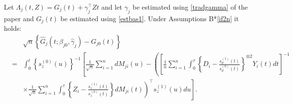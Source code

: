 \documentclass[11pt]{article}
\newcommand{\eqnn}{\begin{eqnarray*}}
\newcommand{\een}{\end{eqnarray*}}
\begin{document}
\begin{lemmas}\label{ifQ21ab}
Let $\Lambda_j(t,Z)=G_j(t) + \gamma_j^{\top} Z t$ and let  $ \gamma_j$ be estimated using \eqref{tradgamma} of the paper and $G_j(t)$ be estimated using \eqref{estbas1}.
Under Assumptions B*\ref{if2n} it holds:
\eqnn
&&\sqrt{n}\left\{\hat G_j(t ; \beta_{j0}, \hat \gamma_j)-G_{j0}(t)\right\}
\\&=&\int_0^t\left\{s_z^{(0)}(u)\right\}^{-1}\left[\frac{1}{\sqrt{n}}\sum_{i=1}^ndM_{ji}(u)-\left(\left[\frac{1}{n}\sum_{i=1}^n\int_0^{\tau}\left\{D_i-\frac{s_d^{(1)}(t)}{s_d^{(0)}(t)}\right\}^{\otimes 2}Y_i(t)dt\right]^{-1}
\right.\right.\nonumber\\
&&
\left.\left.\times \frac{1}{\sqrt{n}}\sum_{i=1}^n
\int_0^\tau \left\{Z_i-\frac{s_z^{(1)}(t)}{s_z^{(0)}(t)}\right\}dM_{ji}(t)\right)^\top s_z^{(1)}(u)du\right].\nonumber
\een
\end{lemmas}
\newenvironment{newproof16}{\begin{proof}\textsc{\emph{of Lemma \ref{ifQ21ab}.}}}{\end{proof}}
\end{document}

